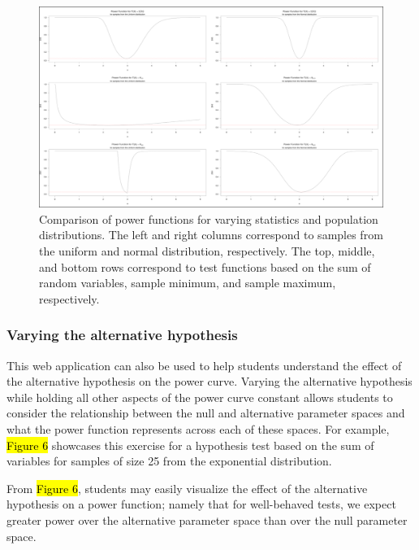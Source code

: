 \documentclass{TISE}
\begin{document}
\begin{figure}[H]
	\centering
	\includegraphics[width=\textwidth]{varystat.png}
	\caption{Comparison of power functions for varying statistics and population distributions. The left and right columns correspond to samples from the uniform and normal distribution, respectively. The top, middle, and bottom rows correspond to test functions based on the sum of random variables, sample minimum, and sample maximum, respectively.}
\end{figure}

\subsubsection{Varying the alternative hypothesis}

This web application can also be used to help students understand the effect of the alternative hypothesis on the power curve. Varying the alternative hypothesis while holding all other aspects of the power curve constant allows students to consider the relationship between the null and alternative parameter spaces and what the power function represents across each of these spaces. For example, \hl{Figure 6} showcases this exercise for a hypothesis test based on the sum of variables for samples of size 25 from the exponential distribution. 

From \hl{Figure 6}, students may easily visualize the effect of the alternative hypothesis on a power function; namely that for well-behaved tests, we expect greater power over the alternative parameter space than over the null parameter space. 
\end{document}
